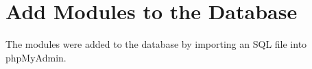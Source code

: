 \chapter{Add Modules to the Database}

The modules were added to the database by importing an SQL file into phpMyAdmin.

\captionsetup{type=figure}

